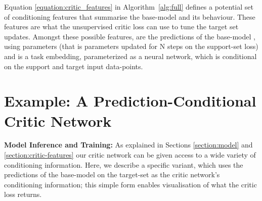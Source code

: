 \documentclass{article} \usepackage[dvipsnames]{xcolor}
\begin{document}
\begin{comment}
Once the updates with respect to the support-set have been completed as per Equation \ref{maml_inner_support_update}, we begin to apply inner-loop steps with respect to the target-set's inputs. To do so, we build a collection of features that provide information about the base-model's state and behaviour (Equation \ref{equation:critic_features}), which we refer to as the \emph{critic feature-set} denoted as , which can contain a range of possible features, such as the predictions of the base-model on the target-set's inputs , and/or the base-model's fully updated weights , and/or a task embedding . Once obtained, the base-model feature collection , can be passed to our critic network , to generate a loss measure. 
\end{comment}
Equation \ref{equation:critic_features} in Algorithm~\ref{alg:full} defines a potential set of conditioning features  that summarise the base-model and its behaviour. These features are what the unsupervised critic loss  can use to tune the target set updates. Amongst these possible features,  are the predictions of the base-model , using parameters  (that is parameters updated for N steps on the support-set loss) and  is a task embedding, parameterized as a neural network, which is conditional on the support and target input data-points. 

\begin{comment}
Then gradients can be computed with respect to the target-set, which can be used to update our model with respect to the target as described in Equation \ref{equation:inner_target_update}. We call this the \emph{inner-loop target-set-adaption process}, which can be repeated for a number of times . Finally, once the final base-model parameters  are obtained, we can compute the target-set predictions and the outer loop optimization loss as expressed in Equation \ref{maml_outer_update_base} and \ref{maml_outer_update_critic}. 
\end{comment}













\section{Example: A Prediction-Conditional Critic Network}
\label{sect:example}
\textbf{Model Inference and Training:}
 As explained in Sections \ref{section:model} and \ref{section:critic-features} our critic network can be given access to a wide variety of conditioning information. Here, we describe a specific variant, which uses the predictions of the base-model on the target-set as the critic network's conditioning information; this simple form enables visualisation of what the critic loss returns. 
 
\end{document}
